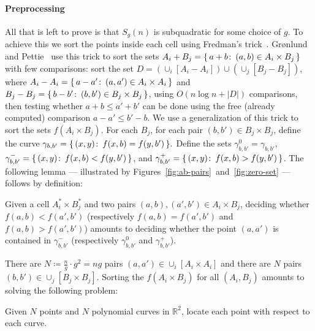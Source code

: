 \paragraph{Preprocessing} All that is left to prove is that $S_g(n)$ is
subquadratic for some choice of $g$. To achieve this we sort the points
inside each cell using Fredman's trick~\cite{F76}. Gr\o nlund and
Pettie~\cite{GP14} use this trick to sort the sets
$A_i + B_j = \{\,a + b \colon\, (a,b) \in A_i \times B_j \,\}$
with few comparisons: sort the set
$D = (\cup_i [A_i - A_i]) \cup (\cup_j [B_j - B_j])$,
where
$A_i - A_i = \{\,a - a' \colon\, (a,a')\in A_i \times A_i \,\}$
and
$B_j - B_j = \{\,b - b' \colon\, (b,b')\in B_j \times B_j \,\}$,
using $O(n\log n + |D|)$ comparisons, then testing whether
$a + b \le a' + b'$
can be done using the free (already computed) comparison
$a - a' \le b' - b$.
We use a generalization of this trick to sort the sets $f(A_i\times B_j)$.
For each $B_j$, for each pair \((b,b') \in B_j \times B_j\),
define the curve
$
	\gamma_{b,b'} = \{\,(x,y) \colon\, f(x,b) = f(y,b')\,\}.
$
Define the sets
$\gamma^0_{b,b'} = \gamma_{b,b'}$,
$\gamma^-_{b,b'} = \{\,(x,y) \colon\, f(x,b) < f(y,b')\,\}$, and
$\gamma^+_{b,b'} = \{\,(x,y) \colon\, f(x,b) > f(y,b')\,\}$.
%
The following lemma --- illustrated by
Figures~\ref{fig:ab-pairs}~and~\ref{fig:zero-set} --- follows by definition:
\begin{lemma}\label{lem:fredman}
Given a cell $A_i^* \times B_j^*$ and two pairs \((a,b), (a',b') \in A_i \times B_j\),
deciding whether \(f(a,b) < f(a',b')\) (respectively
$f(a,b) = f(a',b')$
and
$f(a,b) > f(a',b')$)
amounts to deciding whether the point
$(a,a')$ is contained in \(\gamma^-_{b,b'}\) (respectively
\(\gamma^0_{b,b'}\) and
\(\gamma^+_{b,b'}\)).
\end{lemma}

There are $N \coloneqq \frac ng \cdot g^2 = ng$ pairs $(a,a') \in \cup_i [A_i \times
A_i]$ and there are $N$ pairs $(b,b') \in \cup_j [B_j \times B_j]$.  Sorting
the $f(A_i\times B_j)$ for all $(A_i, B_j)$ amounts to solving the
following problem:
\begin{problem}
    Given $N$ points and $N$ polynomial curves in $\mathbb{R}^2$, locate
    each point with respect to each curve.
\end{problem}

